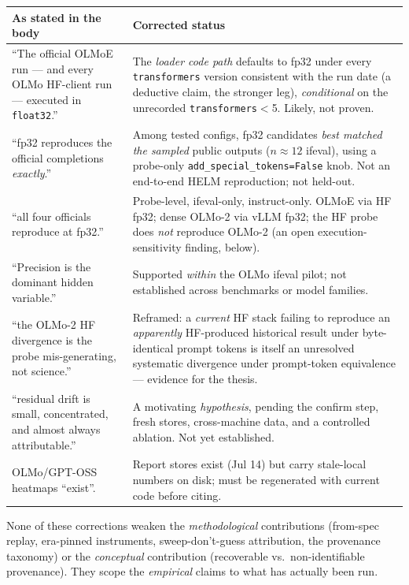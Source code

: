 \documentclass[11pt]{report}
\newcommand{\code}[1]{\texttt{#1}}
\begin{document}
\begin{longtable}{@{}p{}p{}@{}}
\toprule
\textbf{As stated in the body} & \textbf{Corrected status} \\
\midrule
\endhead
``The official OLMoE run --- and every OLMo HF-client run --- executed in
\code{float32}.'' & The \emph{loader code path} defaults to fp32 under every
\code{transformers} version consistent with the run date (a deductive claim, the
stronger leg), \emph{conditional} on the unrecorded \code{transformers}$<$5. Likely,
not proven. \\
``fp32 reproduces the official completions \emph{exactly}.'' & Among tested configs,
fp32 candidates \emph{best matched the sampled} public outputs ($n\approx12$ ifeval),
using a probe-only \code{add\_special\_tokens=False} knob. Not an end-to-end HELM
reproduction; not held-out. \\
``all four officials reproduce at fp32.'' & Probe-level, ifeval-only, instruct-only.
OLMoE via HF fp32; dense OLMo-2 via vLLM fp32; the HF probe does \emph{not} reproduce
OLMo-2 (an open execution-sensitivity finding, below). \\
``Precision is the dominant hidden variable.'' & Supported \emph{within} the OLMo
ifeval pilot; not established across benchmarks or model families. \\
``the OLMo-2 HF divergence is the probe mis-generating, not science.'' & Reframed: a
\emph{current} HF stack failing to reproduce an \emph{apparently} HF-produced
historical result under byte-identical prompt tokens is itself an unresolved
systematic divergence under prompt-token equivalence --- evidence for the thesis. \\
``residual drift is small, concentrated, and almost always attributable.'' & A
motivating \emph{hypothesis}, pending the confirm step, fresh stores, cross-machine
data, and a controlled ablation. Not yet established. \\
OLMo/GPT-OSS heatmaps ``exist''. & Report stores exist (Jul 14) but carry
stale-local numbers on disk; must be regenerated with current code before citing. \\
\bottomrule
\end{longtable}

None of these corrections weaken the \emph{methodological} contributions (from-spec
replay, era-pinned instruments, sweep-don't-guess attribution, the provenance
taxonomy) or the \emph{conceptual} contribution (recoverable vs.\ non-identifiable
provenance). They scope the \emph{empirical} claims to what has actually been run.
\end{document}
